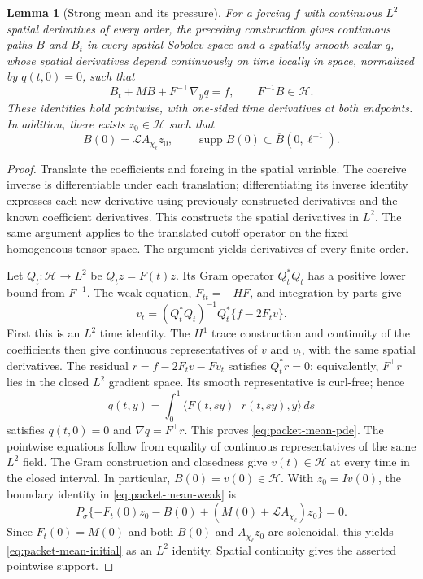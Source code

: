 \documentclass[11pt]{article}
\newtheorem{lemma}[theorem]{Lemma}
\theoremstyle{definition}
\begin{document}
\begin{lemma}[Strong mean and its pressure]\label{lem:packet-strong-mean}
For a forcing $f$ with continuous $L^2$ spatial derivatives of every
order, the preceding construction gives continuous paths $B$ and $B_t$
in every spatial Sobolev space and a spatially smooth scalar $q$,
whose spatial derivatives depend continuously on time locally in space,
normalized by $q(t,0)=0$, such that
\begin{equation}\label{eq:packet-mean-pde}
 B_t+MB+F^{-\top}\nabla_yq=f,
 \qquad F^{-1}B\in\mathcal H.
\end{equation}
These identities hold pointwise, with one-sided time derivatives at both
endpoints. In addition, there exists $z_0\in\mathcal H$ such that
\begin{equation}\label{eq:packet-mean-initial}
 B(0)=\mathcal L A_{\chi_\ell}z_0,
 \qquad\operatorname{supp}B(0)\subset\overline B(0,\ell^{-1}).
\end{equation}
\end{lemma}
\begin{proof}
Translate the coefficients and forcing in the spatial variable. The
coercive inverse is differentiable under each translation; differentiating
its inverse identity expresses each new derivative using previously
constructed derivatives and the known coefficient derivatives. This
constructs the spatial derivatives in $L^2$. The same argument applies to
the translated cutoff operator on the fixed homogeneous tensor space.
The argument yields derivatives of every finite order.

Let $Q_t:\mathcal H\to L^2$ be $Q_tz=F(t)z$. Its Gram operator
$Q_t^*Q_t$ has a positive lower bound from $F^{-1}$. The weak equation,
$F_{tt}=-HF$, and integration by parts give
\[
 v_t=(Q_t^*Q_t)^{-1}Q_t^*\{f-2F_tv\}.
\]
First this is an $L^2$ time identity. The $H^1$ trace construction and
continuity of the coefficients then give continuous representatives of
$v$ and $v_t$, with the same spatial derivatives. The residual
$r=f-2F_tv-Fv_t$ satisfies $Q_t^*r=0$; equivalently,
$F^{\top}r$ lies in the closed $L^2$ gradient space. Its smooth
representative is curl-free; hence
\[
 q(t,y)=\int_0^1\langle F(t,sy)^{\top}r(t,sy),y\rangle\,ds
\]
satisfies $q(t,0)=0$ and $\nabla q=F^{\top}r$. This proves
\eqref{eq:packet-mean-pde}. The pointwise equations follow from equality
of continuous representatives of the same $L^2$ field. The Gram
construction and closedness give $v(t)\in\mathcal H$ at every time in
the closed interval. In particular, $B(0)=v(0)\in\mathcal H$. With $z_0=Iv(0)$,
the boundary identity in \eqref{eq:packet-mean-weak} is
\[
 P_\sigma\{-F_t(0)z_0-B(0)+(M(0)+\mathcal L A_{\chi_\ell})z_0\}=0.
\]
Since $F_t(0)=M(0)$ and both $B(0)$ and $A_{\chi_\ell}z_0$ are
solenoidal, this yields \eqref{eq:packet-mean-initial} as an $L^2$
identity. Spatial continuity gives the asserted pointwise support.
\end{proof}
\end{document}
